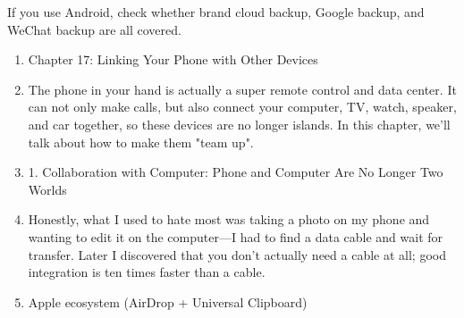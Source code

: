 \begin{tcbpractice}{If you use Android, check whether brand cloud backup, Google backup, and WeChat backup are all covered.}
\begin{enumerate}
  \item Chapter 17: Linking Your Phone with Other Devices
  \item The phone in your hand is actually a super remote control and data center. It can not only make calls, but also connect your computer, TV, watch, speaker, and car together, so these devices are no longer islands. In this chapter, we'll talk about how to make them "team up".
  \item 1. Collaboration with Computer: Phone and Computer Are No Longer Two Worlds
  \item Honestly, what I used to hate most was taking a photo on my phone and wanting to edit it on the computer—I had to find a data cable and wait for transfer. Later I discovered that you don't actually need a cable at all; good integration is ten times faster than a cable.
  \item Apple ecosystem (AirDrop + Universal Clipboard)
\end{enumerate}

\end{tcbpractice}
